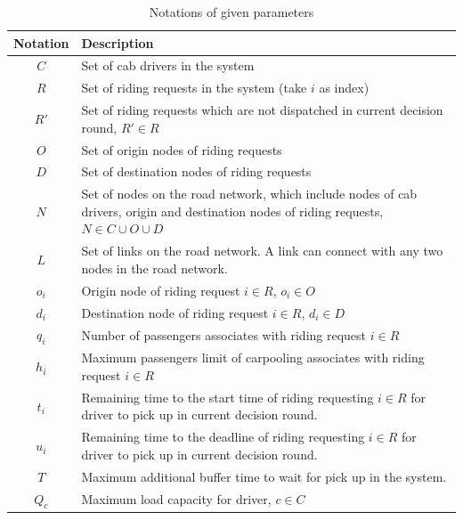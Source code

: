 \renewcommand\arraystretch{1.0}
\par
\begin{longtable}{cp{14cm}}
  \caption{Notations of given parameters}\\
  \toprule
  \multicolumn{1}{l}{Notation}&
  \multicolumn{1}{l}{Description}\\
  \midrule
  \endhead
    $C$ & Set of cab drivers in the system \\
    $R$ & Set of riding requests in the system (take $i$ as index) \\
    $R'$ & Set of riding requests which are not dispatched in current decision round, $R' \in R$ \\
    $O$ & Set of origin nodes of riding requests \\
    $D$ & Set of destination nodes of riding requests \\
    $N$ & Set of nodes on the road network, which include nodes of cab drivers, origin and destination nodes of riding requests, $N \in C \cup O \cup D$ \\
    $L$ & Set of links on the road network. A link can connect with any two nodes in the road network. \\
    $o_i$ & Origin node of riding request $i \in R$, $o_i \in O$ \\
    $d_i$ & Destination node of riding request $i \in R$, $d_i \in D$ \\
    $q_i$ & Number of passengers associates with riding request $i \in R$ \\
    $h_i$ & Maximum passengers limit of carpooling associates with riding request $i \in R$ \\
    $t_i$ & Remaining time to the start time of riding requesting $i \in R$ for driver to pick up in current decision round. \\
    $u_i$ & Remaining time to the deadline of riding requesting $i \in R$ for driver to pick up in current decision round. \\
    $T$ & Maximum additional buffer time to wait for pick up in the system. \\
    $Q_c$ & Maximum load capacity for driver, $c \in C$ \\

\end{longtable}
